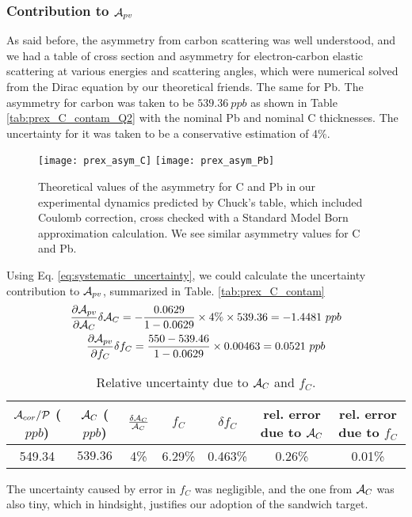 \subsubsection{Contribution to $\mathcal{A}_{pv}$}
As said before, the asymmetry from carbon scattering was well understood, and
we had a table of cross section and asymmetry for electron-carbon elastic scattering
at various energies and scattering angles, which were numerical solved from the Dirac equation
by our theoretical friends. The same for Pb.
The asymmetry for carbon was taken to be $539.36 \ ppb$ as shown in Table \ref{tab:prex_C_contam_Q2}
with the nominal Pb and nominal C thicknesses. The uncertainty for it was taken
to be a conservative estimation of 4\%.
\begin{figure}
    \centering
    \texttt{[image: prex\_asym\_C]}
    \texttt{[image: prex\_asym\_Pb]}
    \caption{Theoretical values of the asymmetry for C and Pb in our experimental 
    dynamics predicted by Chuck's table, which included Coulomb correction, cross
    checked with a Standard Model Born approximation calculation. We see similar
    asymmetry values for C and Pb.}
    \label{prex_asym}
\end{figure}
Using Eq. \ref{eq:systematic_uncertainty}, we could calculate the uncertainty
contribution to $\mathcal{A}_{pv}$, summarized in Table. \ref{tab:prex_C_contam}
\begin{equation*}
    \begin{gathered}
	\frac{\partial \mathcal{A}_{pv}}{\partial \mathcal{A}_C} \delta \mathcal{A}_C = 
	-\frac{0.0629}{1 - 0.0629} \times 4\% \times 539.36 = -1.4481\ ppb   \\
	\frac{\partial \mathcal{A}_{pv}}{\partial f_C}\delta f_C =
	\frac{550 - 539.46}{1 - 0.0629} \times 0.00463 = 0.0521\ ppb	\\
    \end{gathered}
\end{equation*}

\begin{table}
    \centering
    \begin{tabular}{c | c c | c c | c c}
        \hline
	\thead{$\mathcal{A}_{cor}/\mathcal{P}$ \\ ($ppb$)}   & \thead{$\mathcal{A}_C$ \\ ($ppb$)}   & $\frac{\delta\mathcal{A}_C}{\mathcal{A}_C}$   & $f_C$ & $\delta f_C$  & \thead{rel. error \\ due to $\mathcal{A}_C$ } & \thead{rel. error \\ due to $f_C$}\\
        \hline
	549.34	& $539.36$  & 4\%   & 6.29\%	& 0.463\%   & 0.26\%	& 0.01\% \\
        \hline
    \end{tabular}
    \caption{Relative uncertainty due to $\mathcal{A}_C$ and $f_C$.}
    \label{tab:prex_C_contan}
\end{table}
The uncertainty caused by error in $f_C$ was negligible, and the one from $\mathcal{A}_C$
was also tiny, which in hindsight, justifies our adoption of the sandwich target.

